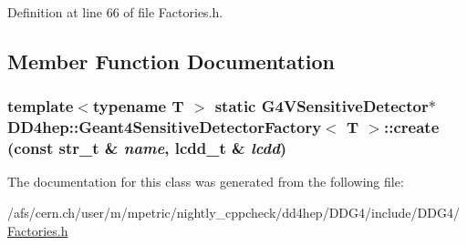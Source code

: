 Definition at line 66 of file Factories.h.

\subsection{Member Function Documentation}
\hypertarget{class_d_d4hep_1_1_geant4_sensitive_detector_factory_a2a64f7e0f2f4ca7076b273b7725b6717}{
\subsubsection[{create}]{\setlength{\rightskip}{0pt plus 5cm}template$<$typename T $>$ static {\bf G4VSensitiveDetector}$\ast$ {\bf DD4hep::Geant4SensitiveDetectorFactory}$<$ {\bf T} $>$::create (const {\bf str\_\-t} \& {\em name}, \/  {\bf lcdd\_\-t} \& {\em lcdd})}}
\label{class_d_d4hep_1_1_geant4_sensitive_detector_factory_a2a64f7e0f2f4ca7076b273b7725b6717}


The documentation for this class was generated from the following file:\begin{DoxyCompactItemize}
\item 
/afs/cern.ch/user/m/mpetric/nightly\_\-cppcheck/dd4hep/DDG4/include/DDG4/\hyperlink{_d_d_g4_2include_2_d_d_g4_2_factories_8h}{Factories.h}\end{DoxyCompactItemize}
